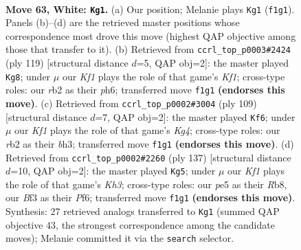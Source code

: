 \documentclass[11pt]{article}
\begin{document}
\clearpage

\begin{figure}[p]\centering
\begin{subfigure}{0.46\textwidth}\centering
\resizebox{\linewidth}{!}{%
\newchessgame
\chessboard[
  setfen={8/7k/8/4p1p1/5p2/5B2/1r6/5K2 w - - 37 63},
  showmover=false,
  pgfstyle=straightmove, color=movearrow, markmove={f1-g1}
]}
\caption{}
\end{subfigure}\hfill
\begin{subfigure}{0.46\textwidth}\centering
\resizebox{\linewidth}{!}{%
\newchessgame
\chessboard[
  setfen={5k2/8/4K2P/6P1/5P2/8/1b6/8 b - - 0 60},
  showmover=false,
  pgfstyle=straightmove, color=movearrow, markmove={f8-g8}
]}
\caption{}
\end{subfigure}
\\[4pt]
\begin{subfigure}{0.46\textwidth}\centering
\resizebox{\linewidth}{!}{%
\newchessgame
\chessboard[
  setfen={8/8/1b1p4/1P1P2k1/2P5/5K1B/8/8 b - - 0 55},
  showmover=false,
  pgfstyle=straightmove, color=movearrow, markmove={g5-f6}
]}
\caption{}
\end{subfigure}\hfill
\begin{subfigure}{0.46\textwidth}\centering
\resizebox{\linewidth}{!}{%
\newchessgame
\chessboard[
  setfen={1r6/R7/5p1k/5P2/6P1/8/6K1/8 b - - 0 69},
  showmover=false,
  pgfstyle=straightmove, color=movearrow, markmove={h6-g5}
]}
\caption{}
\end{subfigure}
\caption{\textbf{Move 63, White: \texttt{Kg1}.} (a) Our position; Melanie plays \texttt{Kg1} (\texttt{f1g1}). Panels (b)--(d) are the retrieved master positions whose correspondence most drove this move (highest QAP objective among those that transfer to it). (b) Retrieved from \texttt{ccrl\_top\_p0003\#2424} (ply 119) [structural distance $d$=5, QAP obj=2]: the master played \texttt{Kg8}; under $\mu$ our \emph{Kf1} plays the role of that game's \emph{Kf1}; cross-type roles: our \emph{r}b2 as their \emph{p}h6; transferred move \texttt{f1g1} \textbf{(endorses this move)}. (c) Retrieved from \texttt{ccrl\_top\_p0002\#3004} (ply 109) [structural distance $d$=7, QAP obj=2]: the master played \texttt{Kf6}; under $\mu$ our \emph{Kf1} plays the role of that game's \emph{Kg4}; cross-type roles: our \emph{r}b2 as their \emph{b}h3; transferred move \texttt{f1g1} \textbf{(endorses this move)}. (d) Retrieved from \texttt{ccrl\_top\_p0002\#2260} (ply 137) [structural distance $d$=10, QAP obj=2]: the master played \texttt{Kg5}; under $\mu$ our \emph{Kf1} plays the role of that game's \emph{Kh3}; cross-type roles: our \emph{p}e5 as their \emph{R}b8, our \emph{B}f3 as their \emph{P}f6; transferred move \texttt{f1g1} \textbf{(endorses this move)}. Synthesis: 27 retrieved analogs transferred to \texttt{Kg1} (summed QAP objective 43, the strongest correspondence among the candidate moves); Melanie committed it via the \texttt{search} selector.}
\label{fig:thought-m124}
\end{figure}
\end{document}
